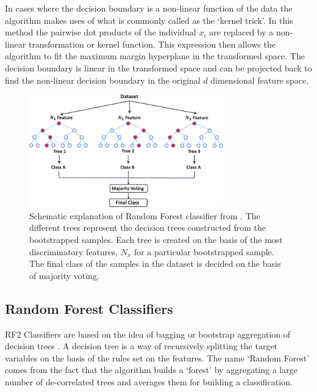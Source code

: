 \documentclass[msthesis.tex]{subfiles}
\begin{document}
In cases where the decision boundary is a non-linear function of the data the algorithm makes uses of what is commonly called as the `kernel trick'. In this method the pairwise dot products of the individual $x_i$ are replaced by a non-linear transformation or kernel function. This expression then allows the algorithm to fit the maximum margin hyperplane in the transformed space. The decision boundary is linear in the transformed space and can be projected back to find the non-linear decision boundary in the original $d$ dimensional feature space. 
\begin{figure}[h]
    \centering
    \includegraphics[width=0.75\textwidth]{images/Random_forest.png}
    \caption{Schematic explanation of Random Forest classifier from \cite{TAHMASEBI2020103619}. The different trees represent the decision trees constructed from the bootstrapped samples. Each tree is created on the basis of the most discriminatory features, $N_x$ for a particular bootstrapped sample. The final class of the samples in the dataset is decided on the basis of majority voting.}
    \label{fig:random_forests}
\end{figure}
\subsection{Random Forest Classifiers}

\gls{RF2} Classifiers are based on the idea of bagging or bootstrap aggregation of decision trees \citep{hastie2009elements}. A decision tree is a way of recursively splitting the target variables on the basis of the rules set on the features. The name `Random Forest' comes from the fact that the algorithm builds a `forest' by aggregating a large number of de-correlated trees and averages them for building a classification. 
\end{document}
